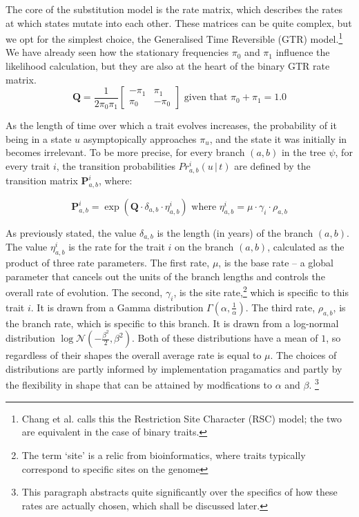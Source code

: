 \documentclass[10pt,journal,compsoc]{IEEEtran}
\begin{document}
The core of the substitution model is the rate matrix, which describes the rates at which states mutate into each other. These matrices can be quite complex, but we opt for the simplest choice, the Generalised Time Reversible (GTR) model.\footnote{Chang et al. calls this the Restriction Site Character (RSC) model; the two are equivalent in the case of binary traits.} We have already seen how the stationary frequencies $\pi_0$ and $\pi_1$ influence the likelihood calculation, but they are also at the heart of the binary GTR rate matrix. 
\begin{equation}
\textbf{Q} = \frac{1}{2\pi_0\pi_1} \begin{bmatrix}
-\pi_1 & \pi_1\\
\pi_0 & -\pi_0
\end{bmatrix} \text{ \ given that \ } \pi_0 + \pi_1 = 1.0
\end{equation}

As the length of time over which a trait evolves increases, the probability of it being in a state $u$ asymptopically approaches $\pi_u$, and the state it was initially in becomes irrelevant. To be more precise, for every branch $(a, b)$ in the tree $\psi$, for every trait $i$, the transition probabilities $Pr^i_{a,b}\left(u\,\vert\,t\right)$ are defined by the transition matrix $\textbf{P}^i_{a,b}$, where:

\begin{equation}
\textbf{P}^i_{a,b} = \exp\left(\textbf{Q} \cdot \delta_{a,b} \cdot \eta^i_{a,b}\right) \text{  \ where  \  } \eta^i_{a,b} = \mu \cdot \gamma_i \cdot \rho_{a,b}
\end{equation}

As previously stated, the value $\delta_{a,b}$ is the length (in years) of the branch $(a, b)$. The value $\eta^i_{a,b}$ is the rate for the trait $i$ on the branch $(a, b)$, calculated as the product of three rate parameters. The first rate,  $\mu$, is the base rate -- a global parameter that cancels out the units of the branch lengths and controls the overall rate of evolution. The second, $\gamma_i$, is the site rate,\footnote{The term `site' is a relic from bioinformatics, where traits typically correspond to specific sites on the genome} which is specific to this trait $i$. It is drawn from a Gamma distribution $\Gamma(\alpha, \frac{1}{\alpha})$. The third rate, $\rho_{a,b}$, is the branch rate, which is specific to this branch. It is drawn from a log-normal distribution $\log \mathcal{N}(-\frac{\beta^2}{2}, \beta^2)$. Both of these distributions have a mean of $1$, so regardless of their shapes the overall average rate is equal to $\mu$. The choices of distributions are partly informed by implementation pragamatics and partly by the flexibility in shape that can be attained by modfications to $\alpha$ and $\beta$. \footnote{This paragraph abstracts quite significantly over the specifics of how these rates are actually chosen, which shall be discussed later.}
\end{document}
